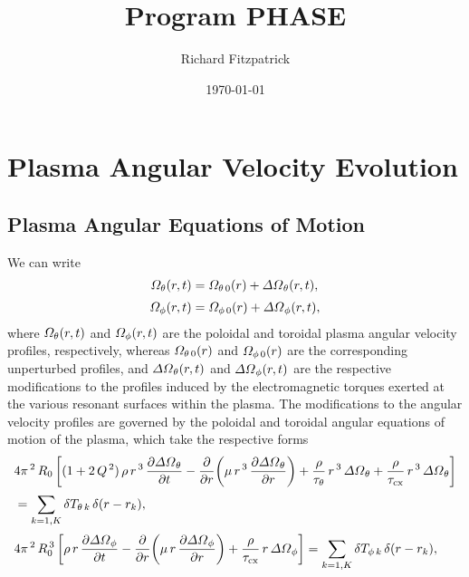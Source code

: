 \documentclass[notitlepage,12pt]{article}
\title{\bf Program PHASE}
\date{\today}
\author{Richard Fitzpatrick}
\begin{document}
\maketitle

\section{Plasma Angular Velocity Evolution}\label{appc}

\subsection{Plasma Angular Equations of Motion}
We can write
\begin{align}\label{e22x}
{\mit\Omega}_\theta(r,t) &={\mit\Omega}_{\theta\,0}(r) + {\mit\Delta\Omega}_\theta(r,t),\\[0.5ex]
{\mit\Omega}_\phi(r,t) &={\mit\Omega}_{\phi\,0}(r) + {\mit\Delta\Omega}_\phi(r,t),\label{e23x}
\end{align}
where  ${\mit\Omega}_{\theta}(r,t)$ and ${\mit\Omega}_{\phi}(r,t)$
  are the  poloidal and toroidal
plasma angular velocity profiles, respectively, whereas 
${\mit\Omega}_{\theta\,0}(r)$ and ${\mit\Omega}_{\phi\,0}(r)$ are
the corresponding unperturbed profiles, and 
 ${\mit\Delta\Omega}_{\theta}(r,t)$ and ${\mit\Delta\Omega}_{\phi}(r,t)$ 
are the respective modifications to the profiles induced by the  electromagnetic torques exerted at the various resonant surfaces
within the plasma. 
The modifications to the angular velocity profiles are governed by the poloidal and toroidal angular equations of
motion of the plasma, which take the respective
 forms
\begin{align}\label{eom1}
& 4\pi^{\,2}\,R_0\left[(1+2\,Q^{\,2})\,\rho\,r^{\,3}\,\frac{\partial{\mit\Delta\Omega}_\theta}{\partial t}-\frac{\partial}{\partial r}\!\left(
\mu\,r^{\,3}\,\frac{\partial{\mit\Delta\Omega}_\theta}{\partial r}\right) +\frac{\rho}{\tau_\theta}\,r^{\,3}\,{\mit\Delta\Omega}_\theta+\frac{\rho}{\tau_{\rm cx}}\,r^{\,3}\,{\mit\Delta\Omega}_\theta\right]
\nonumber\\[0.5ex]&=\sum_{k=1,K} \delta T_{\theta\,k}\,\delta (r-r_k),\\[0.5ex]
& 4\pi^{\,2}\,R_0^{\,3}\left[\rho\,r\,\frac{\partial{\mit\Delta\Omega}_\phi}{\partial t}-\frac{\partial}{\partial r}\!\left(
\mu\,r\,\frac{\partial{\mit\Delta\Omega}_\phi}{\partial r}\right) +\frac{\rho}{\tau_{\rm cx}}\,r\,{\mit\Delta\Omega}_\phi\right]=\sum_{k=1,K} \delta T_{\phi\,k}\,\delta(r-r_k),\label{eom2}
\end{align}
\end{document}
